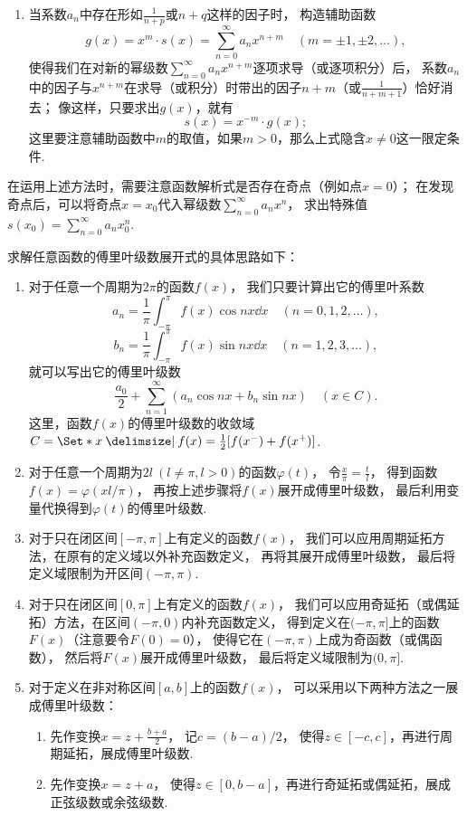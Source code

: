 \begin{enumerate}
\begin{enumerate}
	\item 当系数\(a_n\)中存在形如\(\frac{1}{n+p}\)或\(n+q\)这样的因子时，
	构造辅助函数\[
		g(x) = x^m \cdot s(x) = \sum\limits_{n=0}^\infty a_n x^{n+m}
		\quad(m=\pm1,\pm2,\dotsc),
	\]
	使得我们在对新的幂级数\(\sum\limits_{n=0}^\infty a_n x^{n+m}\)逐项求导（或逐项积分）后，
	系数\(a_n\)中的因子与\(x^{n+m}\)在求导（或积分）时带出的因子\(n+m\)（或\(\frac{1}{n+m+1}\)）恰好消去；
	像这样，只要求出\(g(x)\)，就有\[
		s(x) = x^{-m} \cdot g(x);
	\]
	这里要注意辅助函数中\(m\)的取值，如果\(m>0\)，那么上式隐含\(x\neq0\)这一限定条件.
\end{enumerate}
在运用上述方法时，需要注意函数解析式是否存在奇点（例如点\(x=0\)）；
在发现奇点后，可以将奇点\(x=x_0\)代入幂级数\(\sum\limits_{n=0}^\infty a_n x^n\)，
求出特殊值\(s(x_0) = \sum\limits_{n=0}^\infty a_n x_0^n\).
\end{enumerate}


求解任意函数的傅里叶级数展开式的具体思路如下：
\begin{enumerate}
\item 对于任意一个周期为\(2\pi\)的函数\(f(x)\)，
我们只要计算出它的傅里叶系数\[
a_n = \frac{1}{\pi} \int_{-\pi}^{\pi} f(x) \cos nx \dd{x}
\quad(n=0,1,2,\dotsc),
\]\[
b_n = \frac{1}{\pi} \int_{-\pi}^{\pi} f(x) \sin nx \dd{x}
\quad(n=1,2,3,\dotsc),
\]就可以写出它的傅里叶级数\[
\frac{a_0}{2} + \sum\limits_{n=1}^\infty (a_n \cos nx + b_n \sin nx)
\quad(x \in C).
\]
这里，函数\(f(x)\)的傅里叶级数的收敛域\(C = \Set*{
	x \given
	f(x) = \frac{1}{2} [ f(x^-) + f(x^+) ]
}\).

\item 对于任意一个周期为\(2l\ (l\neq\pi,l>0)\)的函数\(\varphi(t)\)，
令\(\frac{x}{\pi} = \frac{t}{l}\)，
得到函数\(f(x) = \varphi(xl/\pi)\)，
再按上述步骤将\(f(x)\)展开成傅里叶级数，
最后利用变量代换得到\(\varphi(t)\)的傅里叶级数.

\item 对于只在闭区间\([-\pi,\pi]\)上有定义的函数\(f(x)\)，
我们可以应用周期延拓方法，在原有的定义域以外补充函数定义，
再将其展开成傅里叶级数，
最后将定义域限制为开区间\((-\pi,\pi)\).

\item 对于只在闭区间\([0,\pi]\)上有定义的函数\(f(x)\)，
我们可以应用奇延拓（或偶延拓）方法，在区间\((-\pi,0)\)内补充函数定义，
得到定义在\((-\pi,\pi]\)上的函数\(F(x)\)（注意要令\(F(0) = 0\)），
使得它在\((-\pi,\pi)\)上成为奇函数（或偶函数），
然后将\(F(x)\)展开成傅里叶级数，
最后将定义域限制为\((0,\pi]\).

\item 对于定义在非对称区间\([a,b]\)上的函数\(f(x)\)，
可以采用以下两种方法之一展成傅里叶级数：
	\begin{enumerate}
		\item 先作变换\(x = z + \frac{b+a}{2}\)，
		记\(c = (b-a)/2\)，
		使得\(z\in[-c,c]\)，再进行周期延拓，展成傅里叶级数.
		\item 先作变换\(x = z + a\)，
		使得\(z\in[0,b-a]\)，再进行奇延拓或偶延拓，展成正弦级数或余弦级数.
	\end{enumerate}
\end{enumerate}

\endgroup
